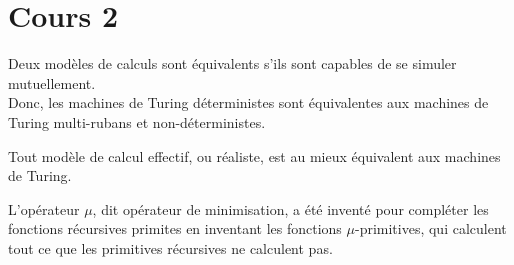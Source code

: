 \section{Cours 2}
Deux modèles de calculs sont équivalents s'ils sont capables de se simuler mutuellement.\\
Donc, les machines de Turing déterministes sont équivalentes aux machines de Turing multi-rubans et non-déterministes.

Tout modèle de calcul effectif, ou réaliste, est au mieux équivalent aux machines de Turing.

L'opérateur $\mu$, dit opérateur de minimisation, a été inventé pour compléter les fonctions récursives primites en
inventant les fonctions $\mu$-primitives, qui calculent tout ce que les primitives récursives ne calculent pas.
